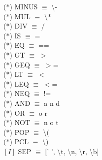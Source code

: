 \documentclass[\main/MemoriaPL.tex]{subfiles}
\begin{document}
    \vspace{2mm}
    \hspace{5mm}($\ast$) MINUS $\equiv$ \textbackslash - \\
    \vspace{2mm}
    \hspace{5mm}($\ast$) MUL $\equiv$ \textbackslash $\ast$ \\
    \vspace{2mm}
    \hspace{5mm}($\ast$) DIV $\equiv$ / \\
    \vspace{2mm}
    \hspace{5mm}($\ast$) IS $\equiv$ = \\
    \vspace{2mm}
    \hspace{5mm}($\ast$) EQ $\equiv$ == \\
    \vspace{2mm}
    \hspace{5mm}($\ast$) GT $\equiv$ $>$ \\
    \vspace{2mm}
    \hspace{5mm}($\ast$) GEQ $\equiv$ $>$= \\
    \vspace{2mm}
    \hspace{5mm}($\ast$) LT $\equiv$ $<$ \\
    \vspace{2mm}
    \hspace{5mm}($\ast$) LEQ $\equiv$ $<$= \\
    \vspace{2mm}
    \hspace{5mm}($\ast$) NEQ $\equiv$ != \\
    \vspace{2mm}
    \hspace{5mm}($\ast$) AND $\equiv$ a n d \\
    \vspace{2mm}
    \hspace{5mm}($\ast$) OR $\equiv$ o r \\
    \vspace{2mm}
    \hspace{5mm}($\ast$) NOT $\equiv$ n o t \\
    \vspace{2mm}
    \hspace{5mm}($\ast$) POP $\equiv$ \textbackslash $($ \\
    \vspace{2mm}
    \hspace{5mm}($\ast$) PCL $\equiv$ \textbackslash $)$ \\
    \vspace{2mm}
    \hspace{5mm}$[I]$ SEP $\equiv$ $[$' ', \textbackslash t, \textbackslash n, \textbackslash r, \textbackslash b] \\
\end{document}
